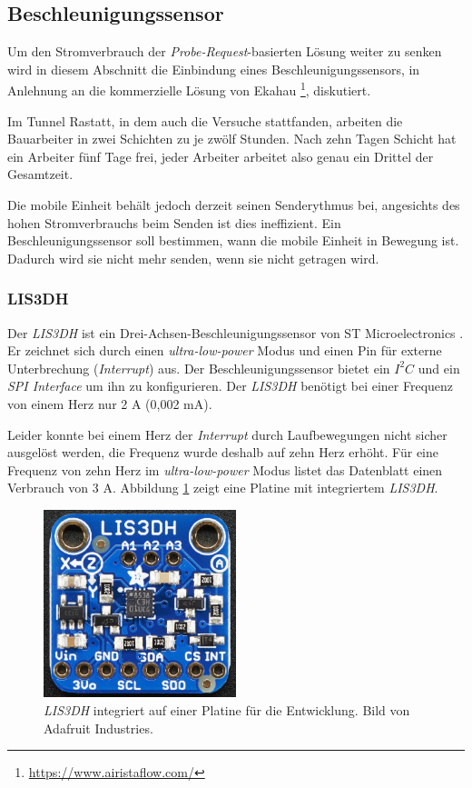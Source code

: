 \subsection{Beschleunigungssensor}
\label{ch:Beschleunigungssensor}
Um den Stromverbrauch der \emph{Probe-Request}-basierten Lösung weiter zu senken wird in diesem Abschnitt die Einbindung eines Beschleunigungssensors, in Anlehnung an die kommerzielle Lösung von Ekahau \footnote{\url{https://www.airistaflow.com/}}, diskutiert. 

Im Tunnel Rastatt, in dem auch die Versuche stattfanden, arbeiten die Bauarbeiter in zwei Schichten zu je zwölf Stunden. 
Nach zehn Tagen Schicht hat ein Arbeiter fünf Tage frei, jeder Arbeiter arbeitet also genau ein Drittel der Gesamtzeit. 

Die mobile Einheit behält jedoch derzeit seinen Senderythmus bei, angesichts des hohen Stromverbrauchs beim Senden ist dies ineffizient.
Ein Beschleunigungssensor soll bestimmen, wann die mobile Einheit in Bewegung ist. 
Dadurch wird sie nicht mehr senden, wenn sie nicht getragen wird.

\subsubsection{LIS3DH}
Der \emph{LIS3DH} ist ein Drei-Achsen-Beschleunigungssensor von ST Microelectronics \cite{st2015lis}.
Er zeichnet sich durch einen \emph{ultra-low-power} Modus und einen Pin für externe Unterbrechung (\emph{Interrupt}) aus.
Der Beschleunigungssensor bietet ein $I^2C$ und ein \emph{SPI Interface} um ihn zu konfigurieren.
Der \emph{LIS3DH} benötigt bei einer Frequenz von einem Herz nur 2 \textmu A (0,002 mA).

Leider konnte bei einem Herz der \emph{Interrupt} durch Laufbewegungen nicht sicher ausgelöst werden, die Frequenz wurde deshalb auf zehn Herz erhöht.
Für eine Frequenz von zehn Herz im \emph{ultra-low-power} Modus listet das Datenblatt einen Verbrauch von 3 \textmu A.
Abbildung \ref{fig:lis3dh} zeigt eine Platine mit integriertem \emph{LIS3DH}.

\begin{figure}[h]
  \centering
	\includegraphics[width=0.5\textwidth]{images/lis3dhada.png}
  \caption{\emph{LIS3DH} integriert auf einer Platine für die Entwicklung. Bild von Adafruit Industries\protect \footnotemark.}
  \label{fig:lis3dh}
\end{figure}

